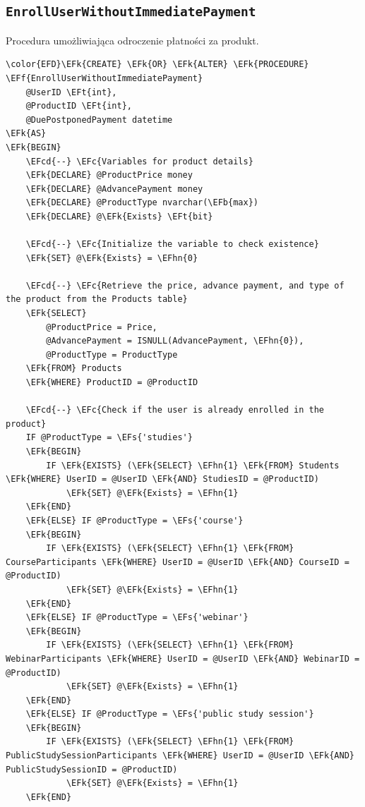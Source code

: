 \documentclass[11pt]{article}
\newcommand{\EFc}[1]{\textcolor{EFc}{\textit{#1}}} %
\newcommand{\EFcd}[1]{\textcolor{EFcd}{\textit{#1}}} %
\newcommand{\EFs}[1]{\textcolor{EFs}{#1}} %
\newcommand{\EFk}[1]{\textcolor{EFk}{\textbf{#1}}} %
\newcommand{\EFb}[1]{\textcolor{EFb}{\textbf{#1}}} %
\newcommand{\EFf}[1]{\textcolor{EFf}{#1}} %
\newcommand{\EFt}[1]{\textcolor{EFt}{\textbf{#1}}} %
\newcommand{\EFhn}[1]{\textcolor{EFhn}{#1}} %
\begin{document}
\subsection{\texttt{EnrollUserWithoutImmediatePayment}}
\label{sec:org26dc978}
Procedura umożliwiająca odroczenie płatności za produkt.
\begin{Code}
\begin{Verbatim}
\color{EFD}\EFk{CREATE} \EFk{OR} \EFk{ALTER} \EFk{PROCEDURE} \EFf{EnrollUserWithoutImmediatePayment}
    @UserID \EFt{int},
    @ProductID \EFt{int},
    @DuePostponedPayment datetime
\EFk{AS}
\EFk{BEGIN}
    \EFcd{--} \EFc{Variables for product details}
    \EFk{DECLARE} @ProductPrice money
    \EFk{DECLARE} @AdvancePayment money
    \EFk{DECLARE} @ProductType nvarchar(\EFb{max})
    \EFk{DECLARE} @\EFk{Exists} \EFt{bit}

    \EFcd{--} \EFc{Initialize the variable to check existence}
    \EFk{SET} @\EFk{Exists} = \EFhn{0}

    \EFcd{--} \EFc{Retrieve the price, advance payment, and type of the product from the Products table}
    \EFk{SELECT} 
        @ProductPrice = Price, 
        @AdvancePayment = ISNULL(AdvancePayment, \EFhn{0}), 
        @ProductType = ProductType 
    \EFk{FROM} Products 
    \EFk{WHERE} ProductID = @ProductID

    \EFcd{--} \EFc{Check if the user is already enrolled in the product}
    IF @ProductType = \EFs{'studies'}
    \EFk{BEGIN}
        IF \EFk{EXISTS} (\EFk{SELECT} \EFhn{1} \EFk{FROM} Students \EFk{WHERE} UserID = @UserID \EFk{AND} StudiesID = @ProductID)
            \EFk{SET} @\EFk{Exists} = \EFhn{1}
    \EFk{END}
    \EFk{ELSE} IF @ProductType = \EFs{'course'}
    \EFk{BEGIN}
        IF \EFk{EXISTS} (\EFk{SELECT} \EFhn{1} \EFk{FROM} CourseParticipants \EFk{WHERE} UserID = @UserID \EFk{AND} CourseID = @ProductID)
            \EFk{SET} @\EFk{Exists} = \EFhn{1}
    \EFk{END}
    \EFk{ELSE} IF @ProductType = \EFs{'webinar'}
    \EFk{BEGIN}
        IF \EFk{EXISTS} (\EFk{SELECT} \EFhn{1} \EFk{FROM} WebinarParticipants \EFk{WHERE} UserID = @UserID \EFk{AND} WebinarID = @ProductID)
            \EFk{SET} @\EFk{Exists} = \EFhn{1}
    \EFk{END}
    \EFk{ELSE} IF @ProductType = \EFs{'public study session'}
    \EFk{BEGIN}
        IF \EFk{EXISTS} (\EFk{SELECT} \EFhn{1} \EFk{FROM} PublicStudySessionParticipants \EFk{WHERE} UserID = @UserID \EFk{AND} PublicStudySessionID = @ProductID)
            \EFk{SET} @\EFk{Exists} = \EFhn{1}
    \EFk{END}


\end{Verbatim}
\end{Code}
\end{document}
